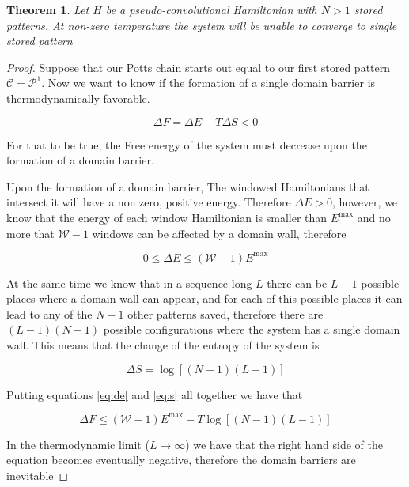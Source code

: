 \documentclass{article}
\newtheorem{theorem}{Theorem}[section]
\theoremstyle{definition}
\theoremstyle{remark}
\begin{document}
\begin{theorem}
    Let $H$ be a pseudo-convolutional Hamiltonian with $N>1$ stored patterns. At non-zero temperature the system will be unable to converge to single stored pattern
    \label{th:no-conv}
\end{theorem}
\begin{proof}
    Suppose that our Potts chain starts out equal to our first stored pattern $\mathcal C=\mathcal P^1$. Now we want to know if the formation of a single domain barrier is thermodynamically favorable.

    \begin{equation}
        \Delta F=\Delta E -T\Delta S<0
    \end{equation}
    
    For that to be true, the Free energy of the system must decrease upon the formation of a domain barrier.

    Upon the formation of a domain barrier, The windowed Hamiltonians that intersect it will have a non zero, positive energy. Therefore $\Delta E>0$, however, we know that the energy of each window Hamiltonian is smaller than $E^\textrm{max}$ and no more that $\mathcal W-1$ windows can be affected by a domain wall, therefore

    \begin{equation}
        0\le\Delta E\le (\mathcal W-1)E^\textrm{max}
        \label{eq:de}
    \end{equation}

    At the same time we know that in a sequence long $L$ there can be $L-1$ possible places where a domain wall can appear, and for each of this possible places it can lead to any of the $N-1$ other patterns saved, therefore there are $(L-1)(N-1)$ possible configurations where the system has a single domain wall. This means that the change of the entropy of the system is 

    \begin{equation}
        \Delta S=\log [(N-1)(L-1)] 
        \label{eq:s}
    \end{equation}

    Putting equations \ref{eq:de} and \ref{eq:s} all together we have that

    \begin{equation}
        \Delta F\le (\mathcal W-1)E^\textrm{max} - T\log [(N-1)(L-1)] 
    \end{equation}

    In the thermodynamic limit ($L\to \infty$) we have that the right hand side of the equation becomes eventually negative, therefore the domain barriers are inevitable
\end{proof}
\end{document}
